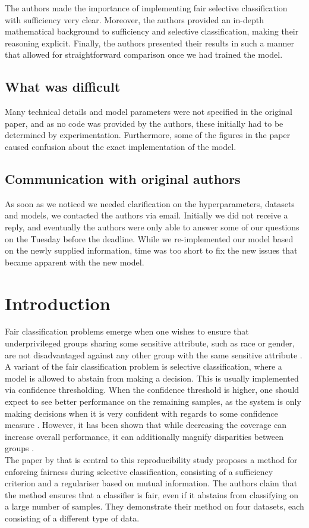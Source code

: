 The authors made the importance of implementing fair selective classification with sufficiency very clear. Moreover, the authors provided an in-depth mathematical background to sufficiency and selective classification, making their reasoning explicit. Finally, the authors presented their results in such a manner that allowed for straightforward comparison once we had trained the model.

\subsection*{What was difficult}

Many technical details and model parameters were not specified in the original paper, and as no code was provided by the authors, these initially had to be determined by experimentation. Furthermore, some of the figures in the paper caused confusion about the exact implementation of the model.


\subsection*{Communication with original authors}
As soon as we noticed we needed clarification on the hyperparameters, datasets and models, we contacted the authors via email. Initially we did not receive a reply, and eventually the authors were only able to answer some of our questions on the Tuesday before the deadline. While we re-implemented our model based on the newly supplied information, time was too short to fix the new issues that became apparent with the new model.

\newpage
\section{Introduction}

Fair classification problems emerge when one wishes to ensure that underprivileged groups sharing some sensitive attribute, such as race or gender, are not disadvantaged against any other group with the same sensitive attribute \citep{lee2021fair}. A variant of the fair classification problem is selective classification, where a model is allowed to abstain from making a decision. This is usually implemented via confidence thresholding. When the confidence threshold is higher, one should expect to see better performance on the remaining samples, as the system is only making decisions when it is very confident with regards to some confidence measure \citep{jones2020selective}. However, it has been shown that while decreasing the coverage can increase overall performance, it can additionally magnify disparities between groups \citep{jones2020selective}. \\
The paper by \citet{lee2021fair} that is central to this reproducibility study proposes a method for enforcing fairness during selective classification, consisting of a sufficiency criterion and a regulariser based on mutual information. The authors claim that the method ensures that a classifier is fair, even if it abstains from classifying on a large number of samples. They demonstrate their method on four datasets, each consisting of a different type of data.


